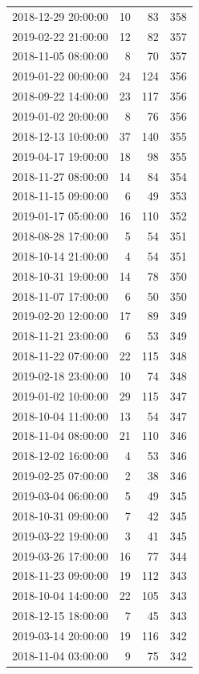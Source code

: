 \begin{tabular}{lrrr}
2018-12-29 20:00:00 & 10 & 83 & 358 \\
2019-02-22 21:00:00 & 12 & 82 & 357 \\
2018-11-05 08:00:00 & 8 & 70 & 357 \\
2019-01-22 00:00:00 & 24 & 124 & 356 \\
2018-09-22 14:00:00 & 23 & 117 & 356 \\
2019-01-02 20:00:00 & 8 & 76 & 356 \\
2018-12-13 10:00:00 & 37 & 140 & 355 \\
2019-04-17 19:00:00 & 18 & 98 & 355 \\
2018-11-27 08:00:00 & 14 & 84 & 354 \\
2018-11-15 09:00:00 & 6 & 49 & 353 \\
2019-01-17 05:00:00 & 16 & 110 & 352 \\
2018-08-28 17:00:00 & 5 & 54 & 351 \\
2018-10-14 21:00:00 & 4 & 54 & 351 \\
2018-10-31 19:00:00 & 14 & 78 & 350 \\
2018-11-07 17:00:00 & 6 & 50 & 350 \\
2019-02-20 12:00:00 & 17 & 89 & 349 \\
2018-11-21 23:00:00 & 6 & 53 & 349 \\
2018-11-22 07:00:00 & 22 & 115 & 348 \\
2019-02-18 23:00:00 & 10 & 74 & 348 \\
2019-01-02 10:00:00 & 29 & 115 & 347 \\
2018-10-04 11:00:00 & 13 & 54 & 347 \\
2018-11-04 08:00:00 & 21 & 110 & 346 \\
2018-12-02 16:00:00 & 4 & 53 & 346 \\
2019-02-25 07:00:00 & 2 & 38 & 346 \\
2019-03-04 06:00:00 & 5 & 49 & 345 \\
2018-10-31 09:00:00 & 7 & 42 & 345 \\
2019-03-22 19:00:00 & 3 & 41 & 345 \\
2019-03-26 17:00:00 & 16 & 77 & 344 \\
2018-11-23 09:00:00 & 19 & 112 & 343 \\
2018-10-04 14:00:00 & 22 & 105 & 343 \\
2018-12-15 18:00:00 & 7 & 45 & 343 \\
2019-03-14 20:00:00 & 19 & 116 & 342 \\
2018-11-04 03:00:00 & 9 & 75 & 342 \\

\end{tabular}
